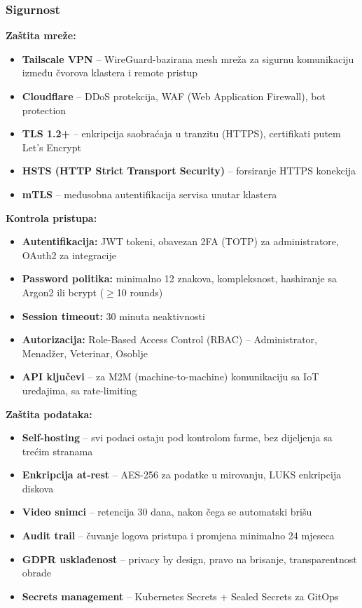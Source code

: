 \documentclass{article}
\begin{document}
\subsubsection{Sigurnost}

\textbf{Zaštita mreže:}
\begin{itemize}
    \item \textbf{Tailscale VPN} -- WireGuard-bazirana mesh mreža za sigurnu komunikaciju između čvorova klastera i remote pristup
    \item \textbf{Cloudflare} -- DDoS protekcija, WAF (Web Application Firewall), bot protection
    \item \textbf{TLS 1.2+} -- enkripcija saobraćaja u tranzitu (HTTPS), certifikati putem Let's Encrypt
    \item \textbf{HSTS (HTTP Strict Transport Security)} -- forsiranje HTTPS konekcija
    \item \textbf{mTLS} -- međusobna autentifikacija servisa unutar klastera
\end{itemize}

\textbf{Kontrola pristupa:}
\begin{itemize}
    \item \textbf{Autentifikacija:} JWT tokeni, obavezan 2FA (TOTP) za administratore, OAuth2 za integracije
    \item \textbf{Password politika:} minimalno 12 znakova, kompleksnost, hashiranje sa Argon2 ili bcrypt ($\geq$10 rounds)
    \item \textbf{Session timeout:} 30 minuta neaktivnosti
    \item \textbf{Autorizacija:} Role-Based Access Control (RBAC) -- Administrator, Menadžer, Veterinar, Osoblje
    \item \textbf{API ključevi} -- za M2M (machine-to-machine) komunikaciju sa IoT uređajima, sa rate-limiting
\end{itemize}

\textbf{Zaštita podataka:}
\begin{itemize}
    \item \textbf{Self-hosting} -- svi podaci ostaju pod kontrolom farme, bez dijeljenja sa trećim stranama
    \item \textbf{Enkripcija at-rest} -- AES-256 za podatke u mirovanju, LUKS enkripcija diskova
    \item \textbf{Video snimci} -- retencija 30 dana, nakon čega se automatski brišu
    \item \textbf{Audit trail} -- čuvanje logova pristupa i promjena minimalno 24 mjeseca
    \item \textbf{GDPR usklađenost} -- privacy by design, pravo na brisanje, transparentnost obrade
    \item \textbf{Secrets management} -- Kubernetes Secrets + Sealed Secrets za GitOps
\end{itemize}
\end{document}
